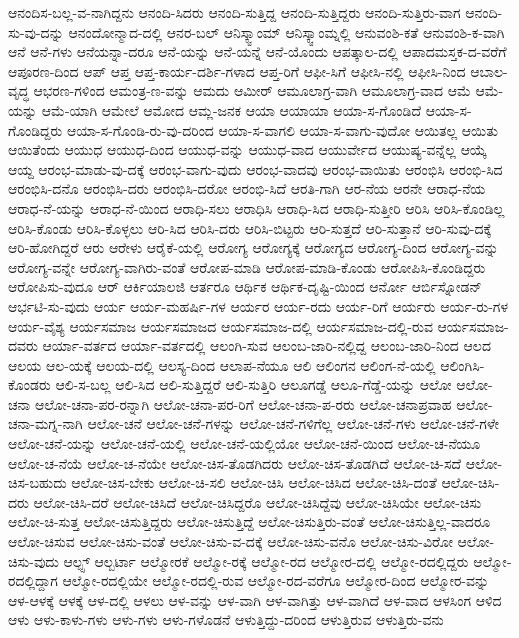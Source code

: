 {ಆನಂದಿಸ-ಬಲ್ಲ-ವ-ನಾಗಿದ್ದನು
ಆನಂದಿ-ಸಿದರು
ಆನಂದಿ-ಸುತ್ತಿದ್ದ
ಆನಂದಿ-ಸುತ್ತಿದ್ದರು
ಆನಂದಿ-ಸುತ್ತಿರು-ವಾಗ
ಆನಂದಿ-ಸು-ವು-ದನ್ನು
ಆನಂದೋನ್ಮಾದ-ದಲ್ಲಿ
ಆನರ-ಬಲ್
ಆನಿಸ್ಕ್ವಾಂಮ್
ಆನಿಸ್ಕ್ವಾಂಮ್ನಲ್ಲಿ
ಆನುವಂಶಿ-ಕತೆ
ಆನುವಂಶಿ-ಕ-ವಾಗಿ
ಆನೆ
ಆನೆ-ಗಳು
ಆನೆಯನ್ನಾ-ದರೂ
ಆನೆ-ಯನ್ನು
ಆನೆ-ಯನ್ನೆ
ಆನೆ-ಯೊಂದು
ಆಪತ್ಕಾಲ-ದಲ್ಲಿ
ಆಪಾದಮಸ್ತಕ-ದ-ವರೆಗೆ
ಆಪೂರಣ-ದಿಂದ
ಆಪ್
ಆಪ್ತ
ಆಪ್ತ-ಕಾರ್ಯ-ದರ್ಶಿ-ಗಳಾದ
ಆಪ್ತ-ರಿಗೆ
ಆಫೀ-ಸಿಗೆ
ಆಫೀಸಿ-ನಲ್ಲಿ
ಆಫೀಸಿ-ನಿಂದ
ಆಬಾಲ-ವೃದ್ಧ
ಆಭರಣ-ಗಳಿಂದ
ಆಮಂತ್ರ-ಣ-ವನ್ನು
ಆಮದು
ಆಮೀರ್
ಆಮೂಲಾಗ್ರ-ವಾಗಿ
ಆಮೂಲಾಗ್ರ-ವಾದ
ಆಮೆ
ಆಮೆ-ಯನ್ನು
ಆಮೆ-ಯಾಗಿ
ಆಮೇಲೆ
ಆಮೋದ
ಆಮ್ಲ-ಜನಕ
ಆಯಾ
ಆಯಾಯಾ
ಆಯಾ-ಸ-ಗೊಂಡಿದೆ
ಆಯಾ-ಸ-ಗೊಂಡಿದ್ದರು
ಆಯಾ-ಸ-ಗೊಂಡಿ-ರು-ವು-ದರಿಂದ
ಆಯಾ-ಸ-ವಾಗಲಿ
ಆಯಾ-ಸ-ವಾಗು-ವುದೋ
ಆಯಿತಲ್ಲ
ಆಯಿತು
ಆಯಿತೆಂದು
ಆಯುಧ
ಆಯುಧ-ದಿಂದ
ಆಯುಧ-ವನ್ನು
ಆಯುಧ-ವಾದ
ಆಯುರ್ವೇದ
ಆಯುಷ್ಯ-ವನ್ನೆಲ್ಲ
ಆಯ್ಕೆ
ಆಯ್ದ
ಆರಂಭ-ಮಾಡು-ವು-ದಕ್ಕೆ
ಆರಂಭ-ವಾಗು-ವುದು
ಆರಂಭ-ವಾದವು
ಆರಂಭ-ವಾಯಿತು
ಆರಂಭಿಸಿ
ಆರಂಭಿ-ಸಿದ
ಆರಂಭಿಸಿ-ದನೊ
ಆರಂಭಿಸಿ-ದರು
ಆರಂಭಿಸಿ-ದರೋ
ಆರಂಭಿ-ಸಿದೆ
ಆರತಿ-ಗಾಗಿ
ಆರ-ನೆಯ
ಆರನೇ
ಆರಾಧ-ನೆಯ
ಆರಾಧ-ನೆ-ಯನ್ನು
ಆರಾಧ-ನೆ-ಯಿಂದ
ಆರಾಧಿ-ಸಲು
ಆರಾಧಿಸಿ
ಆರಾಧಿ-ಸಿದ
ಆರಾಧಿ-ಸುತ್ತೀರಿ
ಆರಿಸಿ
ಆರಿಸಿ-ಕೊಂಡಿಲ್ಲ
ಆರಿಸಿ-ಕೊಂಡು
ಆರಿಸಿ-ಕೊಳ್ಳಲು
ಆರಿ-ಸಿದ
ಆರಿಸಿ-ದರು
ಆರಿಸಿ-ಬಿಟ್ಟರು
ಆರಿ-ಸುತ್ತದೆ
ಆರಿ-ಸುತ್ತಾನೆ
ಆರಿ-ಸುವು-ದಕ್ಕೆ
ಆರಿ-ಹೋಗಿದ್ದರೆ
ಆರು
ಆರೇಳು
ಆರೈಕೆ-ಯಲ್ಲಿ
ಆರೋಗ್ಯ
ಆರೋಗ್ಯಕ್ಕೆ
ಆರೋಗ್ಯದ
ಆರೋಗ್ಯ-ದಿಂದ
ಆರೋಗ್ಯ-ವನ್ನು
ಆರೋಗ್ಯ-ವನ್ನೇ
ಆರೋಗ್ಯ-ವಾಗಿರು-ವಂತೆ
ಆರೋಪ-ಮಾಡಿ
ಆರೋಪ-ಮಾಡಿ-ಕೊಂಡು
ಆರೋಪಿಸಿ-ಕೊಂಡಿದ್ದರು
ಆರೋಪಿಸು-ವುದೂ
ಆರ್
ಆರ್ಕಿಯಾಲಜಿ
ಆರ್ತರೂ
ಆರ್ಥಿಕ
ಆರ್ಥಿಕ-ದೃಷ್ಟಿ-ಯಿಂದ
ಆರ್ನೋ
ಆರ್ಬಿಸ್ನೋಡನ್
ಆರ್ಭಟಿ-ಸು-ವುದು
ಆರ್ಯ
ಆರ್ಯ-ಮಹರ್ಷಿ-ಗಳ
ಆರ್ಯರ
ಆರ್ಯ-ರದು
ಆರ್ಯ-ರಿಗೆ
ಆರ್ಯರು
ಆರ್ಯ-ರು-ಗಳ
ಆರ್ಯ-ವೈಶ್ಯ
ಆರ್ಯಸಮಾಜ
ಆರ್ಯಸಮಾಜದ
ಆರ್ಯಸಮಾಜ-ದಲ್ಲಿ
ಆರ್ಯಸಮಾಜ-ದಲ್ಲಿ-ರುವ
ಆರ್ಯಸಮಾಜ-ದವರು
ಆರ್ಯಾ-ವರ್ತದ
ಆರ್ಯಾ-ವರ್ತದಲ್ಲಿ
ಆಲಂಗಿ-ಸುವ
ಆಲಂಬ-ಜಾರಿ-ನಲ್ಲಿದ್ದ
ಆಲಂಬ-ಜಾರಿ-ನಿಂದ
ಆಲದ
ಆಲಯ
ಆಲ-ಯಕ್ಕೆ
ಆಲಯ-ದಲ್ಲಿ
ಆಲಸ್ಯ-ದಿಂದ
ಆಲಾಪ-ನೆಯೂ
ಆಲಿ
ಆಲಿಂಗನ
ಆಲಿಂಗ-ನೆ-ಯಲ್ಲಿ
ಆಲಿಂಗಿಸಿ-ಕೊಂಡರು
ಆಲಿ-ಸ-ಬಲ್ಲ
ಆಲಿ-ಸಿದ
ಆಲಿ-ಸುತ್ತಿದ್ದರೆ
ಆಲಿ-ಸುತ್ತಿರಿ
ಆಲೂಗಡ್ಡೆ
ಆಲೂ-ಗೆಡ್ಡೆ-ಯನ್ನು
ಆಲೋ
ಆಲೋ-ಚನಾ
ಆಲೋ-ಚನಾ-ಪರ-ರನ್ನಾಗಿ
ಆಲೋ-ಚನಾ-ಪರ-ರಿಗೆ
ಆಲೋ-ಚನಾ-ಪ-ರರು
ಆಲೋ-ಚನಾಪ್ರವಾಹ
ಆಲೋ-ಚನಾ-ಮಗ್ನ-ನಾಗಿ
ಆಲೋ-ಚನೆ
ಆಲೋ-ಚನೆ-ಗಳನ್ನು
ಆಲೋ-ಚನೆ-ಗಳಿಗೆಲ್ಲ
ಆಲೋ-ಚನೆ-ಗಳು
ಆಲೋ-ಚನೆ-ಗಳೇ
ಆಲೋ-ಚನೆ-ಯನ್ನು
ಆಲೋ-ಚನೆ-ಯಲ್ಲಿ
ಆಲೋ-ಚನೆ-ಯಲ್ಲಿಯೋ
ಆಲೋ-ಚನೆ-ಯಿಂದ
ಆಲೋ-ಚ-ನೆಯೂ
ಆಲೋ-ಚ-ನೆಯೆ
ಆಲೋ-ಚ-ನೆಯೇ
ಆಲೋ-ಚಿಸ-ತೊಡಗಿದರು
ಆಲೋ-ಚಿಸ-ತೊಡಗಿದೆ
ಆಲೋ-ಚಿ-ಸದೆ
ಆಲೋ-ಚಿಸ-ಬಹುದು
ಆಲೋ-ಚಿಸ-ಬೇಕು
ಆಲೋ-ಚಿ-ಸಲಿ
ಆಲೋ-ಚಿಸಿ
ಆಲೋ-ಚಿಸಿದ
ಆಲೋ-ಚಿಸಿ-ದಂತೆ
ಆಲೋ-ಚಿಸಿ-ದರು
ಆಲೋ-ಚಿಸಿ-ದರೆ
ಆಲೋ-ಚಿಸಿದೆ
ಆಲೋ-ಚಿಸಿದ್ದರೊ
ಆಲೋ-ಚಿಸಿದ್ದೆವು
ಆಲೋ-ಚಿಸಿಯೇ
ಆಲೋ-ಚಿಸು
ಆಲೋ-ಚಿ-ಸುತ್ತ
ಆಲೋ-ಚಿಸುತ್ತಿದ್ದರು
ಆಲೋ-ಚಿಸುತ್ತಿದ್ದೆ
ಆಲೋ-ಚಿಸುತ್ತಿರು-ವಂತೆ
ಆಲೋ-ಚಿಸುತ್ತಿಲ್ಲ-ವಾದರೂ
ಆಲೋ-ಚಿಸುವ
ಆಲೋ-ಚಿಸು-ವಂತೆ
ಆಲೋ-ಚಿಸು-ವ-ದಕ್ಕೆ
ಆಲೋ-ಚಿಸು-ವನೊ
ಆಲೋ-ಚಿಸು-ವಿರೋ
ಆಲೋ-ಚಿಸು-ವುದು
ಆಲ್ಫ್ಸ್
ಆಲ್ಬರ್ಟಾ
ಆಲ್ಮೋರಕೆ
ಆಲ್ಮೋ-ರಕ್ಕೆ
ಆಲ್ಮೋ-ರದ
ಆಲ್ಮೋರ-ದಲ್ಲಿ
ಆಲ್ಮೋ-ರದಲ್ಲಿದ್ದರು
ಆಲ್ಮೋ-ರದಲ್ಲಿದ್ದಾಗ
ಆಲ್ಮೋ-ರದಲ್ಲಿಯೇ
ಆಲ್ಮೋ-ರದಲ್ಲಿ-ರುವ
ಆಲ್ಮೋ-ರದ-ವರೆಗೂ
ಆಲ್ಮೋರ-ದಿಂದ
ಆಲ್ಮೋರ-ವನ್ನು
ಆಳ-ಆಳಕ್ಕೆ
ಆಳಕ್ಕೆ
ಆಳ-ದಲ್ಲಿ
ಆಳಲು
ಆಳ-ವನ್ನು
ಆಳ-ವಾಗಿ
ಆಳ-ವಾಗಿತ್ತು
ಆಳ-ವಾಗಿದೆ
ಆಳ-ವಾದ
ಆಳಸಿಂಗ
ಆಳಿದ
ಆಳು
ಆಳು-ಕಾಳು-ಗಳು
ಆಳು-ಗಳು
ಆಳು-ಗಳೊಡನೆ
ಆಳುತ್ತಿದ್ದು-ದರಿಂದ
ಆಳುತ್ತಿರುವ
ಆಳುತ್ತಿರು-ವನು
}
